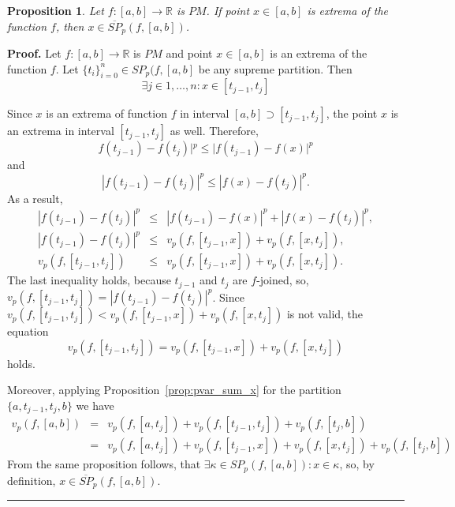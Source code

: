 \documentclass[12pt, a4paper]{article}
\newtheorem{proposition}[theorem]{Proposition}
\newenvironment{proof}[1][Proof]{\noindent \textbf{#1.} }{\  \rule{0.5em}{0.5em}}
\numberwithin{equation}{section}
\begin{document}
\begin{proposition}\label{prop:SplitMinMax}
  Let $f:[a,b] \rightarrow \mathbb{R}$ is $PM$. 
  If point $x \in [a,b]$ is extrema of the function $f$, 
  then $x \in \overline{SP}_p(f,[a, b])$.
\end{proposition}
\begin{proof}
  Let $f:[a,b] \rightarrow \mathbb{R}$ is $PM$ and
  point $x \in [a,b]$ is an extrema of the function $f$.
  Let $\{t_i\}_{i=0}^{n} \in SP_p(f,[a,b]$ 
  be any supreme partition. 
  Then
  \begin{equation}
    \exists j \in 1,\dots,n: x \in [t_{j-1},t_j] 
  \end{equation}  

  Since $x$ is an extrema of function $f$ in interval
  $[a, b] \supset [t_{j-1},t_j]$, 
  the point $x$ is an extrema in interval 
  $[t_{j-1}, t_j]$ as well. Therefore,
  \begin{equation}
    f(t_{j-1})-f(t_{j})|^p \leq |f(t_{j-1}) - f(x)|^p
  \end{equation}
  and
  \begin{equation}
    |f(t_{j-1})-f(t_{j})|^p \leq |f(x)-f(t_{j})|^p.
  \end{equation}
  As a result,
  \begin{eqnarray*}
  |f(t_{j-1})-f(t_{j})|^p 
    &\leq &|f(t_{j-1}) - f(x)|^p + |f(x) - f(t_{j})|^p,\\
  |f(t_{j-1}) - f(t_{j})|^p 
    &\leq & v_p(f, [t_{j-1}, x]) + v_p(f, [x, t_{j}]),\\
  v_p(f, [t_{j-1}, t_{j}])
    &\leq & v_p(f,[t_{j-1}, x]) + v_p(f,[x, t_{j}]).
  \end{eqnarray*}    
  The last inequality holds, because $t_{j-1}$ and  $t_{j}$
  are $f$-joined, so, 
  $v_p(f, [t_{j-1}, t_{j}])=|f(t_{j-1}) - f(t_{j})|^p$.
  Since $v_p(f, [t_{j-1}, t_{j}])
    < v_p(f,[t_{j-1}, x]) + v_p(f,[x, t_{j}])$
  is not valid, the equation
  \begin{equation}
    v_p(f, [t_{j-1}, t_{j}])
    = v_p(f,[t_{j-1}, x]) + v_p(f,[x, t_{j}])  
  \end{equation}
  holds.
  
  Moreover, applying Proposition~\ref{prop:pvar_sum_x} 
  for the partition
  $\{a, t_{j-1}, t_j, b \}$ we have 
   \begin{eqnarray*}
    v_p(f, [a, b]) &=& v_p(f,[a, t_{j}]) 
      + v_p(f,[t_{j-1}, t_{j}]) + v_p(f,[t_{j}, b]) \\
    &=& v_p(f,[a, t_{j}]) + v_p(f,[t_{j-1}, x]) 
      + v_p(f,[x, t_{j}]) + v_p(f,[t_{j}, b])
  \end{eqnarray*}
  From the same proposition follows, that
  $\exists \kappa \in SP_p(f, [a, b]):x\in\kappa$,
  so, by definition, $x \in \overline{SP}_p(f,[a, b])$.  
\end{proof}
\end{document}
